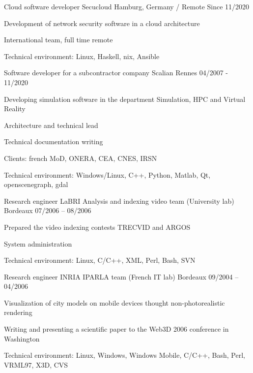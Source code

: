 \begin{cventries}
  \cventry
    {Cloud software developer}
    {Secucloud}
    {Hamburg, Germany / Remote}
    {Since 11/2020}
    {
      \begin{cvitems}
        \item {Development of network security software in a cloud architecture}
        \item {International team, full time remote}
        \item {Technical environment: Linux, Haskell, nix, Ansible}
      \end{cvitems}
    }

  \cventry
    {Software developer for a subcontractor company}
    {Scalian}
    {Rennes}
    {04/2007 - 11/2020}
    {
      \begin{cvitems}
        \item {Developing simulation software in the department Simulation, HPC
            and Virtual Reality}
        \item {Architecture and technical lead}
        \item {Technical documentation writing}
        \item {Clients: french MoD, ONERA, CEA, CNES, IRSN}
        \item {Technical environment: Windows/Linux, C++, Python, Matlab, Qt,
            openscenegraph, gdal}
      \end{cvitems}
    }

  \cventry
    {Research engineer}
    {LaBRI Analysis and indexing video team (University lab)}
    {Bordeaux}
    {07/2006 – 08/2006}
    {
      \begin{cvitems}
        \item {Prepared the video indexing contests TRECVID and ARGOS}
        \item {System administration}
        \item {Technical environment: Linux, C/C++, XML, Perl, Bash, SVN}
      \end{cvitems}
    }

  \cventry
    {Research engineer}
    {INRIA IPARLA team (French IT lab)}
    {Bordeaux}
    {09/2004 – 04/2006}
    {
      \begin{cvitems}
        \item {Visualization of city models on mobile devices thought
            non-photorealistic rendering}
        \item {Writing and presenting a scientific paper to the Web3D 2006
            conference in Washington}
        \item {Technical environment: Linux, Windows, Windows Mobile, C/C++,
            Bash, Perl, VRML97, X3D, CVS}
      \end{cvitems}
    }


\end{cventries}
